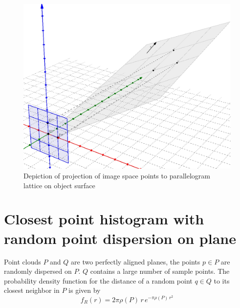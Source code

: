 \begin{figure}[h]
\centering
\includegraphics[width=.9\textwidth]{fig/lattice_proof.png}
\caption{Depiction of projection of image space points to parallelogram lattice on object surface}
\label{fig:lattice_proof}
\end{figure}


\FloatBarrier

\section{Closest point histogram with random point dispersion on plane} \label{sec:proof_rand_disp_plane}
Point clouds $P$ and $Q$ are two perfectly aligned planes, the points $p \in P$ are randomly dispersed on $P$. $Q$ contains a large number of sample points. The probability density function for the distance of a random point $q \in Q$ to its closest neighbor in $P$ is given by
\begin{equation}
f_R(r) = 2 \pi \rho(P) \, r \, e^{-\pi \rho(P) \, r^2}
\end{equation}


